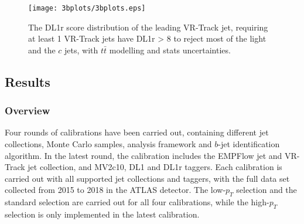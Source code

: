 \documentclass[letterpaper,12pt]{article}
\begin{document}
\begin{figure}
    \centering
    \begin{minipage}[b]{.45\textwidth}
\centering
\texttt{[image: 3bplots/3bplots.eps]}
\end{minipage}
	\caption{The DL1r score distribution of the leading VR-Track jet, 
	requiring at least 1 VR-Track jets have DL1r > 8 to reject most of 
	the light and the $c$ jets, with $t\bar{t}$ modelling and stats uncertainties. }
    \label{fig:3bplots}
\end{figure}


\subsection{Results}
\label{result}


\subsubsection{Overview}
Four rounds of calibrations have been carried out, containing different 
jet collections, Monte Carlo samples, analysis framework 
and $b$-jet identification algorithm. In the latest round, 
the calibration includes the EMPFlow jet and VR-Track jet collection, 
and MV2c10, DL1 and DL1r taggers. Each calibration is carried out 
with all supported jet collections and taggers, with the full data 
set collected from 2015 to 2018 in the ATLAS detector. The low-$p_T$ 
selection and the standard selection are carried out for all four 
calibrations, while the high-$p_T$ selection is only implemented 
in the latest calibration. 
\end{document}
